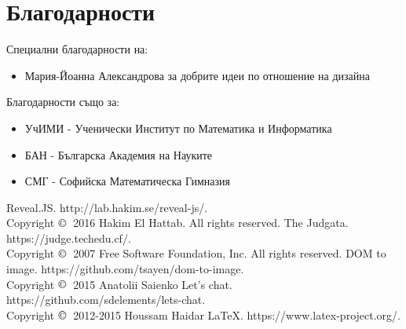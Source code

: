 \documentclass[12pt]{article}
\begin{document}
	\section{Благодарности}
	Специални благодарности на:
	\begin{itemize}
		\item Мария-Йоанна Александрова за добрите идеи по отношение на дизайна
	\end{itemize}
	Благодарности също за:
	\begin{itemize}
		\item УчИМИ - Ученически Институт по Математика и Информатика
		\item БАН - Българска Академия на Науките
		\item СМГ - Софийска Математическа Гимназия
	\end{itemize}
	\begin{thebibliography}{9}
		{Reveal.JS}.
		{http://lab.hakim.se/reveal-js/}. \\
		Copyright $\copyright\;$ 2016 Hakim El Hattab. All rights reserved.
		{The Judgata}.
		{https://judge.techedu.cf/}. \\
		Copyright $\copyright\;$ 2007 Free Software Foundation, Inc. All rights reserved.
		{DOM to image}.
		{https://github.com/tsayen/dom-to-image}. \\
		Copyright $\copyright\;$ 2015 Anatolii Saienko
		{Let's chat}.
		{https://github.com/sdelements/lets-chat}. \\
		Copyright $\copyright\;$ 2012-2015 Houssam Haidar
		{\LaTeX}.
		{https://www.latex-project.org/}.
	\end{thebibliography}
\end{document}
